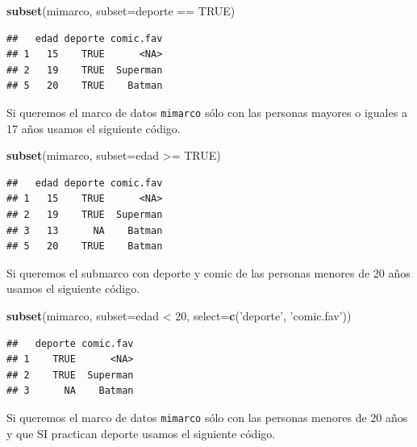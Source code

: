 \documentclass[10pt,]{krantz}
\makeatletter
\newenvironment{Shaded}{\begin{snugshade}}{\end{snugshade}}
\newcommand{\KeywordTok}[1]{\textcolor[rgb]{0.13,0.29,0.53}{\textbf{{#1}}}}
\newcommand{\DataTypeTok}[1]{\textcolor[rgb]{0.13,0.29,0.53}{{#1}}}
\newcommand{\DecValTok}[1]{\textcolor[rgb]{0.00,0.00,0.81}{{#1}}}
\newcommand{\StringTok}[1]{\textcolor[rgb]{0.31,0.60,0.02}{{#1}}}
\newcommand{\OtherTok}[1]{\textcolor[rgb]{0.56,0.35,0.01}{{#1}}}
\newcommand{\NormalTok}[1]{{#1}}
\newenvironment{kframe}{%
\medskip{}
\setlength{\fboxsep}{.8em}
 \def\at@end@of@kframe{}%
 \ifinner\ifhmode%
  \def\at@end@of@kframe{\end{minipage}}%
  \begin{minipage}{\columnwidth}%
 \fi\fi%
 \def\FrameCommand##1{\hskip\@totalleftmargin \hskip-\fboxsep
 \colorbox{shadecolor}{##1}\hskip-\fboxsep
     \hskip-\linewidth \hskip-\@totalleftmargin \hskip\columnwidth}%
 \MakeFramed {\advance\hsize-\width
   \@totalleftmargin\z@ \linewidth\hsize
   \@setminipage}}%
 {\par\unskip\endMakeFramed%
 \at@end@of@kframe}
\renewenvironment{Shaded}{\begin{kframe}}{\end{kframe}}
\makeatother
\begin{document}
\begin{Shaded}
\begin{Highlighting}[]
\KeywordTok{subset}\NormalTok{(mimarco, }\DataTypeTok{subset=}\NormalTok{deporte ==}\StringTok{ }\OtherTok{TRUE}\NormalTok{)}
\end{Highlighting}
\end{Shaded}

\begin{verbatim}
##   edad deporte comic.fav
## 1   15    TRUE      <NA>
## 2   19    TRUE  Superman
## 5   20    TRUE    Batman
\end{verbatim}

Si queremos el marco de datos \texttt{mimarco} sólo con las personas
mayores o iguales a 17 años usamos el siguiente código.

\begin{Shaded}
\begin{Highlighting}[]
\KeywordTok{subset}\NormalTok{(mimarco, }\DataTypeTok{subset=}\NormalTok{edad >=}\StringTok{ }\OtherTok{TRUE}\NormalTok{)}
\end{Highlighting}
\end{Shaded}

\begin{verbatim}
##   edad deporte comic.fav
## 1   15    TRUE      <NA>
## 2   19    TRUE  Superman
## 3   13      NA    Batman
## 5   20    TRUE    Batman
\end{verbatim}

Si queremos el submarco con deporte y comic de las personas menores de
20 años usamos el siguiente código.

\begin{Shaded}
\begin{Highlighting}[]
\KeywordTok{subset}\NormalTok{(mimarco, }\DataTypeTok{subset=}\NormalTok{edad <}\StringTok{ }\DecValTok{20}\NormalTok{, }\DataTypeTok{select=}\KeywordTok{c}\NormalTok{(}\StringTok{'deporte'}\NormalTok{, }\StringTok{'comic.fav'}\NormalTok{))}
\end{Highlighting}
\end{Shaded}

\begin{verbatim}
##   deporte comic.fav
## 1    TRUE      <NA>
## 2    TRUE  Superman
## 3      NA    Batman
\end{verbatim}

Si queremos el marco de datos \texttt{mimarco} sólo con las personas
menores de 20 años y que SI practican deporte usamos el siguiente
código.
\end{document}
